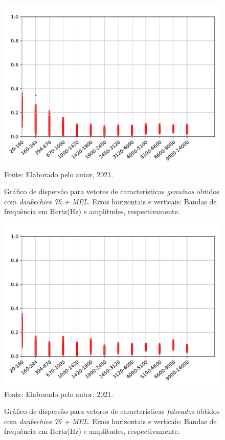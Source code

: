 \begin{figure}[H]
	\centering
	\caption{Gráfico de dispersão para vetores de características \textit{genuínos} obtidos com \textit{daubechies 76 + MEL}.  Eixos horizontais e verticais: Bandas de frequência em Hertz(Hz) e amplitudes, respectivamente.}
	\includegraphics[scale=.75]{./images/results/barkVersusMel/Genuine_daub76_Mel.pdf}
	\label{fig:livedaub76mel}
	\\Fonte: Elaborado pelo autor, 2021.
\end{figure}
\begin{figure}[H]
	\centering
	\caption{Gráfico de dispersão para vetores de características \textit{falseados} obtidos com \textit{daubechies 76 + MEL}.  Eixos horizontais e verticais: Bandas de frequência em Hertz(Hz) e amplitudes, respectivamente.}
	\includegraphics[scale=.75]{./images/results/barkVersusMel/Spoofing_daub76_Mel.pdf}
	\label{fig:spoofingdaub76mel}
	\\Fonte: Elaborado pelo autor, 2021.
\end{figure}
